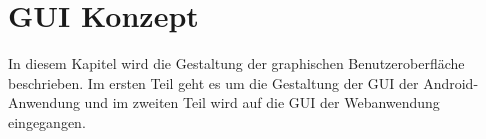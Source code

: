 

\chapter{GUI Konzept} 

In diesem Kapitel wird die Gestaltung der graphischen Benutzeroberfl\"ache beschrieben.
Im ersten Teil geht es um die Gestaltung der GUI der Android-Anwendung und im zweiten Teil wird auf die GUI der Webanwendung eingegangen.

%

%
